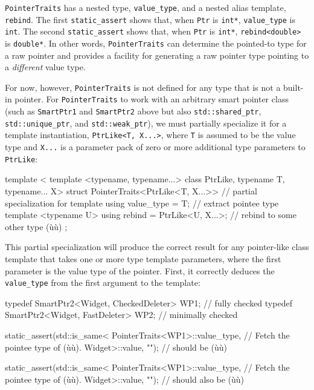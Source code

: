 \lstinline!PointerTraits! has a nested type, \lstinline!value_type!, and a
nested alias template, \lstinline!rebind!. The first
\lstinline!static_assert! shows that, when \lstinline!Ptr! is \lstinline!int*!,
\lstinline!value_type! is \lstinline!int!. The second \lstinline!static_assert!
shows that, when \lstinline!Ptr! is \lstinline!int*!, \lstinline!rebind<double>!
is \lstinline!double*!. In other words, \lstinline!PointerTraits! can
determine the pointed-to type for a raw pointer and provides a facility
for generating a raw pointer type pointing to a \emph{different} value
type.

For now, however, \lstinline!PointerTraits! is not defined for any type
that is not a built-in pointer. For \lstinline!PointerTraits! to work with
an arbitrary smart pointer class (such as \lstinline!SmartPtr1! and
\lstinline!SmartPtr2! above but also \lstinline!std::shared_ptr!,
\lstinline!std::unique_ptr!, and \lstinline!std::weak_ptr!), we must
partially specialize it for a template instantiation,
\lstinline!PtrLike<T,!~\lstinline!X...>!, where \lstinline!T! is assumed to be
the value type and \lstinline!X...! is a parameter pack of zero or more
additional type parameters to \lstinline!PtrLike!:

\begin{emcppslisting}[emcppsbatch=e40]
template <
    template <typename, typename...> class PtrLike,
    typename T, typename... X>
struct PointerTraits<PtrLike<T, X...>>  // partial specialization for template
{
    using value_type = T;               // extract pointee type
    template <typename U>
    using rebind = PtrLike<U, X...>;    // rebind to some other type (ù{}ù)
};
\end{emcppslisting}
    

\noindent This partial specialization will produce the correct result for any
pointer-like class template that takes one or more type template
parameters, where the first parameter is the value type of the pointer.
First, it correctly deduces the \lstinline!value_type! from the first
argument to the template:

\begin{emcppslisting}[emcppsbatch=e40]
typedef SmartPtr2<Widget, CheckedDeleter>  WP1;  // fully checked
typedef SmartPtr2<Widget, FastDeleter>     WP2;  // minimally checked

static_assert(std::is_same<
    PointerTraits<WP1>::value_type,  // Fetch the pointee type of (ù{}ù).
    Widget>::value, "");             // should be (ù{}ù)

static_assert(std::is_same<
    PointerTraits<WP1>::value_type,  // Fetch the pointee type of (ù{}ù).
    Widget>::value, "");             // should also be (ù{}ù)
\end{emcppslisting}
    

